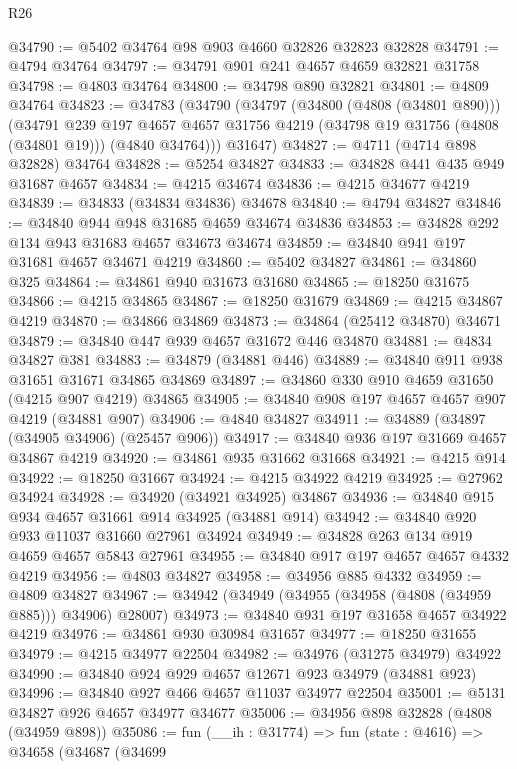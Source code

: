 \begin{lexlean}{R26}
\begin{coremodule}
@34790 := @5402 @34764 @98 @903 @4660 @32826 @32823 @32828
@34791 := @4794 @34764
@34797 := @34791 @901 @241 @4657 @4659 @32821 @31758
@34798 := @4803 @34764
@34800 := @34798 @890 @32821
@34801 := @4809 @34764
@34823 := @34783
    (@34790
      (@34797
        (@34800 (@4808 (@34801 @890)))
        (@34791
          @239
          @197
          @4657
          @4657
          @31756
          @4219
          (@34798 @19 @31756 (@4808 (@34801 @19)))
          (@4840 @34764)))
      @31647)
@34827 := @4711 (@4714 @898 @32828) @34764
@34828 := @5254 @34827
@34833 := @34828 @441 @435 @949 @31687 @4657
@34834 := @4215 @34674
@34836 := @4215 @34677 @4219
@34839 := @34833 (@34834 @34836) @34678
@34840 := @4794 @34827
@34846 := @34840 @944 @948 @31685 @4659 @34674 @34836
@34853 := @34828 @292 @134 @943 @31683 @4657 @34673 @34674
@34859 := @34840 @941 @197 @31681 @4657 @34671 @4219
@34860 := @5402 @34827
@34861 := @34860 @325
@34864 := @34861 @940 @31673 @31680
@34865 := @18250 @31675
@34866 := @4215 @34865
@34867 := @18250 @31679
@34869 := @4215 @34867 @4219
@34870 := @34866 @34869
@34873 := @34864 (@25412 @34870) @34671
@34879 := @34840 @447 @939 @4657 @31672 @446 @34870
@34881 := @4834 @34827 @381
@34883 := @34879 (@34881 @446)
@34889 := @34840 @911 @938 @31651 @31671 @34865 @34869
@34897 := @34860 @330 @910 @4659 @31650 (@4215 @907 @4219) @34865
@34905 := @34840 @908 @197 @4657 @4657 @907 @4219 (@34881 @907)
@34906 := @4840 @34827
@34911 := @34889 (@34897 (@34905 @34906) (@25457 @906))
@34917 := @34840 @936 @197 @31669 @4657 @34867 @4219
@34920 := @34861 @935 @31662 @31668
@34921 := @4215 @914
@34922 := @18250 @31667
@34924 := @4215 @34922 @4219
@34925 := @27962 @34924
@34928 := @34920 (@34921 @34925) @34867
@34936 := @34840 @915 @934 @4657 @31661 @914 @34925 (@34881 @914)
@34942 := @34840 @920 @933 @11037 @31660 @27961 @34924
@34949 := @34828 @263 @134 @919 @4659 @4657 @5843 @27961
@34955 := @34840 @917 @197 @4657 @4657 @4332 @4219
@34956 := @4803 @34827
@34958 := @34956 @885 @4332
@34959 := @4809 @34827
@34967 := @34942 (@34949 (@34955 (@34958 (@4808 (@34959 @885))) @34906) @28007)
@34973 := @34840 @931 @197 @31658 @4657 @34922 @4219
@34976 := @34861 @930 @30984 @31657
@34977 := @18250 @31655
@34979 := @4215 @34977 @22504
@34982 := @34976 (@31275 @34979) @34922
@34990 := @34840 @924 @929 @4657 @12671 @923 @34979 (@34881 @923)
@34996 := @34840 @927 @466 @4657 @11037 @34977 @22504
@35001 := @5131 @34827 @926 @4657 @34977 @34677
@35006 := @34956 @898 @32828 (@4808 (@34959 @898))
@35086 := fun (__ih : @31774) =>
  fun (state : @4616) =>
  @34658
    (@34687
      (@34699

\end{coremodule}
\end{lexlean}
